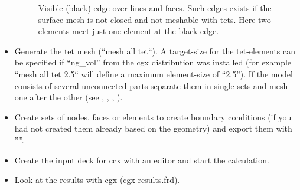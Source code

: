\documentclass{article}
\begin{document}
\begin{appendix}
\begin{itemize}
\begin{figure}[h]
\caption{\label{surfmesh}Visible (black) edge over lines and faces. Such edges exists if the surface mesh is not closed and not meshable with tets. Here two elements meet just one element at the black edge. }
\end{figure}

\item Generate the tet mesh (``mesh all tet``). A target-size for the tet-elements can be specified if ``ng\_vol'' from the cgx distribution was installed (for example ``mesh all tet 2.5`` will define a maximum element-size of ``2.5''). If the model consists of several unconnected parts separate them in single sets and mesh one after the other (see , , , ).

\item Create sets of nodes, faces or elements to create boundary conditions (if you had not created them already based on the geometry) and export them with ''''.

\item Create the input deck for ccx with an editor and start the calculation.

\item Look at the results with cgx (cgx results.frd).
\end{itemize}


\end{appendix}
\end{document}
